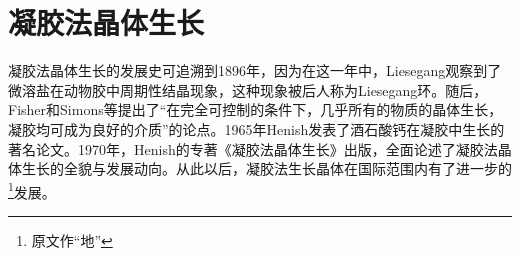 ﻿\section{凝胶法晶体生长}
凝胶法晶体生长的发展史可追溯到1896年，因为在这一年中，Liesegang观察到了微溶盐在动物胶中周期性结晶现象，这种现象被后人称为Liesegang环。随后，Fisher和Simons等提出了“在完全可控制的条件下，几乎所有的物质的晶体生长，凝胶均可成为良好的介质”的论点。1965年Henish发表了酒石酸钙在凝胶中生长的著名论文。1970年，Henish的专著《凝胶法晶体生长》出版，全面论述了凝胶法晶体生长的全貌与发展动向。从此以后，凝胶法生长晶体在国际范围内有了进一步的\footnote{原文作“地”}发展。



